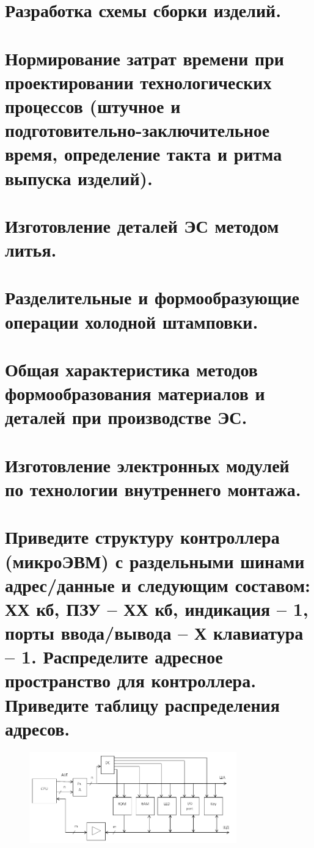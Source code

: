 \documentclass[unicode, 12pt, a4paper, oneside]{article}
\begin{document}
\section{Разработка схемы сборки изделий.}
\section{Нормирование затрат времени при проектировании технологических процессов (штучное и подготовительно-заключительное время, определение такта и ритма выпуска изделий).}
\section{Изготовление деталей ЭС методом литья.}

\section{Разделительные и формообразующие операции холодной штамповки.}

\section{Общая характеристика методов формообразования материалов и деталей при производстве ЭС.}

\section{Изготовление электронных модулей по технологии внутреннего монтажа.}

\section{Приведите структуру контроллера (микроЭВМ) с раздельными шинами адрес/данные и следующим составом: ХХ кб, ПЗУ – ХХ кб, индикация – 1, порты ввода/вывода – Х клавиатура – 1. Распределите адресное пространство для контроллера. Приведите таблицу распределения адресов.}

\begin{figure}[H]
\centering
\includegraphics[width=0.8\textwidth]{101_struct.png}
\end{figure}
\end{document}
